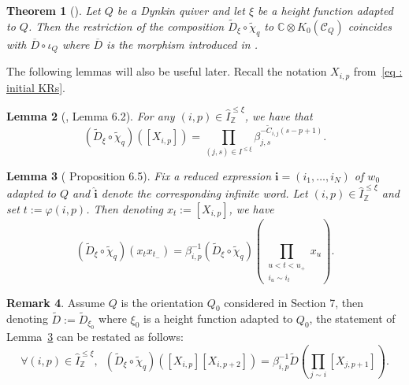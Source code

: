 \documentclass[12pt]{amsart}
\theoremstyle{plain}
\newtheorem{theorem}{Theorem}[section]
\newtheorem{lemma}[theorem]{Lemma}
\theoremstyle{definition}
\newtheorem{remark}[theorem]{Remark}
\numberwithin{equation}{section}
\newcommand{\tchi}{{\widetilde{\chi}}}
\newcommand{\td}{{\widetilde{D}}}
\newcommand{\IxiZ}{\widehat{I}_{\mathbb{Z}}^{ \leq \xi}}
\newcommand{\tdxi}{\widetilde{D}_{\xi}}
\newcommand{\Ixi}{I^{\leq \xi}}
\newcommand{\barD}{\overline{D}}
\newcommand{\CQ}{\mathcal{C}_Q}
\begin{document}
  \begin{theorem}[{\cite[Theorem 6.1]{CasbiLi}}] \label{thm : thm CasbiLi}
  Let $Q$ be a Dynkin quiver and let $\xi$ be a height function adapted to $Q$. Then  the restriction of the composition $\tdxi \circ \tchi_q$ to $\mathbb{C} \otimes K_0(\CQ)$ coincides with $\barD \circ \iota_Q$ where $\barD$ is the morphism introduced in \cite{BKK21}.  
  \end{theorem}

 The following lemmas will also  be useful later. Recall the notation $X_{i,p}$ from~\eqref{eq : initial KRs}.
   
 \begin{lemma}[\cite{CasbiLi}, Lemma 6.2] \label{lem : Dtilde of initial KRs}
    For any $(i,p) \in \IxiZ$, we have that 
 $$ \left( \tdxi \circ \tchi_q \right) \left( [  X_{i,p} ] \right) = \prod_{(j,s) \in \Ixi} \beta_{j,s}^{ -\tilde{C}_{i,j}(s-p+1)} . $$
  \end{lemma}


  \begin{lemma}[\cite{CasbiLi} Proposition 6.5] \label{lem : relation B}
   Fix a reduced expression $\mathbf{i} = (i_1, \ldots , i_N)$ of $w_0$ adapted to $Q$ and $\widehat{\mathbf{i}}$ denote the corresponding infinite word. Let $(i,p) \in \IxiZ$ and set $t := \varphi(i,p)$. Then denoting $x_t := [X_{i,p}]$, we have
   $$  ( \tdxi \circ \tchi_q) (x_tx_{t_-}) = \beta_{i,p}^{-1}  \left( \tdxi \circ \tchi_q \right) \left( \prod_{ \substack{ u < t < u_+ \\ i_u \sim i_t}} x_u \right) .  $$
  \end{lemma}



   \begin{remark}
  Assume $Q$ is the orientation $Q_0$ considered in \cite{CasbiLi} Section 7, then denoting $\td := \td_{\xi_0}$ where $\xi_0$ is a height function adapted to $Q_0$, the statement of Lemma~\ref{lem : relation B} can be restated as follows:
\begin{equation} \label{eq : relation B for initial KRs}
 \forall (i,p) \in \IxiZ, \enspace   \left( \tdxi \circ \tchi_q  \right) \left( [X_{i,p}] [X_{i,p+2}] \right) = \beta_{i,p}^{-1} \td \left( \prod_{j \sim i} [X_{j,p+1}] \right) .  
 \end{equation}
 \end{remark}
  
\end{document}
